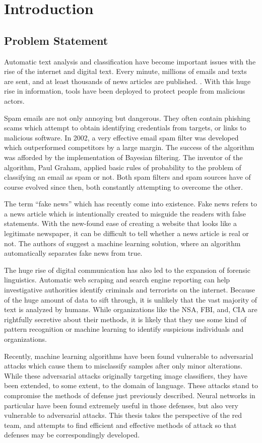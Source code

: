 \chapter{Introduction}
\section{Problem Statement}
Automatic text analysis and classification have become important issues with the rise of the internet and digital text.  Every minute, millions of emails and texts are sent, and at least thousands of news articles are published. \cite{jj17,mr16}.  With this huge rise in information, tools have been deployed to protect people from malicious actors. 

Spam emails are not only annoying but dangerous.  They often contain phishing scams which attempt to obtain identifying credentials from targets, or links to malicious software.  In 2002, a very effective email spam filter was developed which outperformed competitors by a large margin. \cite{bl02} The success of the algorithm was afforded by the implementation of Bayesian filtering.  The inventor of the algorithm, Paul Graham, applied basic rules of probability to the problem of classifying an email as spam or not.  Both spam filters and spam sources have of course evolved since then, both constantly attempting to overcome the other.

The term ``fake news'' which has recently come into existence.  Fake news refers to a news article which is intentionally created to misguide the readers with false statements.  With the new-found ease of creating a website that looks like a legitimate newspaper, it can be difficult to tell whether a news article is real or not.  The authors of \cite{nr17} suggest a machine learning solution, where an algorithm automatically separates fake news from true.

The huge rise of digital communication has also led to the expansion of forensic linguistics.  Automatic web scraping and search engine reporting can help investigative authorities identify criminals and terrorists on the internet.  Because of the huge amount of data to sift through, it is unlikely that the vast majority of text is analyzed by humans.  While organizations like the NSA, FBI, and, CIA are rightfully secretive about their methods, it is likely that they use some kind of pattern recognition or machine learning to identify suspicious individuals and organizations.

Recently, machine learning algorithms have been found vulnerable to adversarial attacks which cause them to misclassify samples after only minor alterations. \cite{cs14} While these adversarial attacks originally targeting image classifiers, they have been extended, to some extent, to the domain of language. \cite{np16} These attacks stand to compromise the methods of defense just previously described.  Neural networks in particular have been found extremely useful in those defenses, but also very vulnerable to adversarial attacks.  This thesis takes the perspective of the red team, and attempts to find efficient and effective methods of attack so that defenses may be correspondingly developed.

